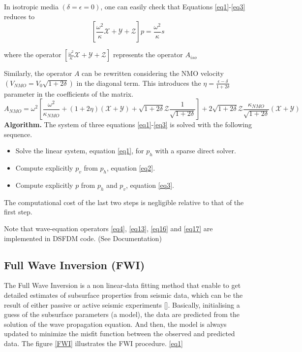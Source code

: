 In isotropic media $(\delta = \epsilon = 0)$, one can easily check that Equations \ref{eq1}-\ref{eq3} reduces to
\begin{equation}
\left[ \frac{\omega^{2}}{\kappa} \mathcal{X} + \mathcal{Y} + \mathcal{Z} \right] p=\frac{\omega^{2}}{\kappa} s \label{eq16}
\end{equation}

where the operator $\left[ \frac{\omega^{2}}{\kappa} \mathcal{X} + \mathcal{Y} + \mathcal{Z} \right]$ represents the operator $A_{iso}$

Similarly, the operator $A$ can be rewritten considering the NMO velocity $(V_{NMO} = V_0\sqrt{1+2\delta} )$ in the diagonal term. This introduces the $\eta = \frac{\epsilon -\delta}{1+2\delta}$ parameter in the coefficients of the matrix.
\begin{equation}
A_{NMO} = \omega^{2} \left[ \frac{\omega^{2}}{\kappa_{NMO}} + (1+2 \eta) (\mathcal{X} + \mathcal{Y}) + \sqrt{1+2\delta} \mathcal{Z} \frac{1}{\sqrt{1+2\delta}} \right]+ 2 \sqrt{1+2\delta} \mathcal{Z} \frac{\kappa_{NMO}}{\sqrt{1+2\delta}} (\mathcal{X} + \mathcal{Y})\label{eq17}
\end{equation}
\textbf{Algorithm.} \newline
The system of three equations \ref{eq1}-\ref{eq3} is solved with the following sequence.
\begin{itemize}
\item Solve the linear system, equation \ref{eq1}, for $p_h$ with a sparse direct solver.
\item Compute explicitly $p_v$ from $p_h$, equation \ref{eq2}.
\item Compute explicitly $p$ from $p_h$ and $p_v$, equation \ref{eq3}.
\end{itemize}
The computational cost of the last two steps is negligible relative to that of the first step.

Note that wave-equation operators \ref{eq4}, \ref{eq13}, \ref{eq16} and \ref{eq17} are implemented in DSFDM code. (See Documentation)

\subsection{Full Wave Inversion (FWI)}
The Full Wave Inversion is a non linear-data fitting method that enable to get detailed estimates of subsurface properties from seismic data, which can be the result of either passive or active seismic experiments []. Basically, initialising a guess of the subsurface parameters (a model), the data are predicted from the solution of the wave propagation equation. And then, the model is always updated to minimize the misfit function between the observed and predicted data. The figure \ref{FWI} illustrates the FWI procedure. \eqref{eq1}

